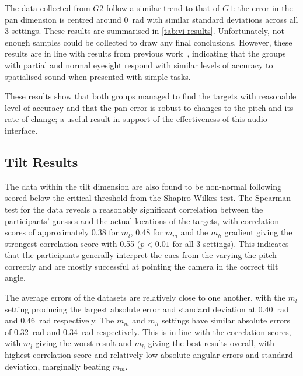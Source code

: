 \documentclass[sigconf, screen=true, anonymous=true]{acmart}
\begin{document}
The data collected from $G2$ follow a similar trend to that of $G1$: the error in the pan dimension is centred around \SI{0}{\radian} with similar standard deviations across all 3 settings.
These results are summarised in \cref{tab:vi-results}.
Unfortunately, not enough samples could be collected to draw any final conclusions.
However, these results are in line with results from previous work~\cite{zwiers2001spatial}, indicating that the groups with partial and normal eyesight respond with similar levels of accuracy to spatialised sound when presented with simple tasks. 

These results show that both groups managed to find the targets with reasonable level of accuracy and that the pan error is robust to changes to the pitch and its rate of change; a useful result in support of the effectiveness of this audio interface.

\subsection{Tilt Results}\label{sec:tilt-results}


The data within the tilt dimension are also found to be non-normal following scored below the critical threshold from the Shapiro-Wilkes test.
The Spearman test for the data reveals a reasonably significant correlation between the participants' guesses and the actual locations of the targets, with correlation scores of approximately 0.38 for $m_l$, 0.48 for $m_m$ and the $m_h$ gradient giving the strongest correlation score with 0.55 ($p < 0.01$ for all 3 settings).
This indicates that the participants generally interpret the cues from the varying the pitch correctly and are mostly successful at pointing the camera in the correct tilt angle.

The average errors of the datasets are relatively close to one another, with the $m_l$ setting producing the largest absolute error and standard deviation at \SI{0.40}{\radian} and \SI{0.46}{\radian} respectively.
The $m_m$ and $m_h$ settings have similar absolute errors of \SI{0.32}{\radian} and \SI{0.34}{\radian} respectively.
This is in line with the correlation scores, with $m_l$ giving the worst result and $m_h$ giving the best results overall, with highest correlation score and relatively low absolute angular errors and standard deviation, marginally beating $m_m$. 
\end{document}
